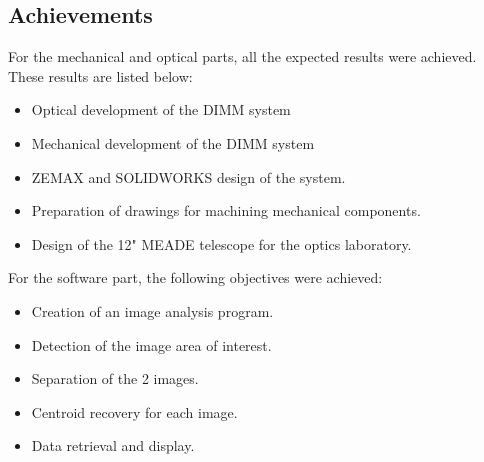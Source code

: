 \subsection{Achievements}
For the mechanical and optical parts, all the expected results were achieved. These results are listed below:
\begin{itemize}
    \item Optical development of the \Gls{DIMM} system
    \item Mechanical development of the \Gls{DIMM} system
    \item ZEMAX and SOLIDWORKS design of the system.
    \item Preparation of drawings for machining mechanical components.
    \item Design of the 12" MEADE telescope for the optics laboratory.
\end{itemize}
For the software part, the following objectives were achieved:
\begin{itemize}
    \item Creation of an image analysis program.
    \item Detection of the image area of interest.
    \item Separation of the 2 images.
    \item Centroid recovery for each image.
    \item Data retrieval and display.
\end{itemize}
